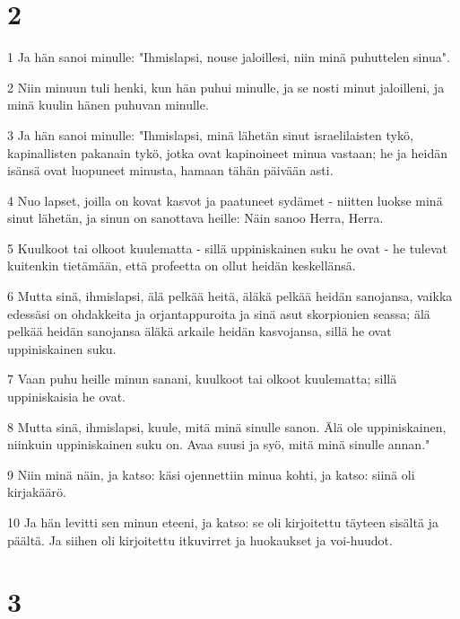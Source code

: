\chapter{2}

\par 1 Ja hän sanoi minulle: "Ihmislapsi, nouse jaloillesi, niin minä puhuttelen sinua".
\par 2 Niin minuun tuli henki, kun hän puhui minulle, ja se nosti minut jaloilleni, ja minä kuulin hänen puhuvan minulle.
\par 3 Ja hän sanoi minulle: "Ihmislapsi, minä lähetän sinut israelilaisten tykö, kapinallisten pakanain tykö, jotka ovat kapinoineet minua vastaan; he ja heidän isänsä ovat luopuneet minusta, hamaan tähän päivään asti.
\par 4 Nuo lapset, joilla on kovat kasvot ja paatuneet sydämet - niitten luokse minä sinut lähetän, ja sinun on sanottava heille: Näin sanoo Herra, Herra.
\par 5 Kuulkoot tai olkoot kuulematta - sillä uppiniskainen suku he ovat - he tulevat kuitenkin tietämään, että profeetta on ollut heidän keskellänsä.
\par 6 Mutta sinä, ihmislapsi, älä pelkää heitä, äläkä pelkää heidän sanojansa, vaikka edessäsi on ohdakkeita ja orjantappuroita ja sinä asut skorpionien seassa; älä pelkää heidän sanojansa äläkä arkaile heidän kasvojansa, sillä he ovat uppiniskainen suku.
\par 7 Vaan puhu heille minun sanani, kuulkoot tai olkoot kuulematta; sillä uppiniskaisia he ovat.
\par 8 Mutta sinä, ihmislapsi, kuule, mitä minä sinulle sanon. Älä ole uppiniskainen, niinkuin uppiniskainen suku on. Avaa suusi ja syö, mitä minä sinulle annan."
\par 9 Niin minä näin, ja katso: käsi ojennettiin minua kohti, ja katso: siinä oli kirjakäärö.
\par 10 Ja hän levitti sen minun eteeni, ja katso: se oli kirjoitettu täyteen sisältä ja päältä. Ja siihen oli kirjoitettu itkuvirret ja huokaukset ja voi-huudot.

\chapter{3}

